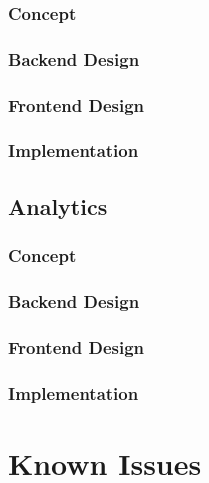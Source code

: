 \subsubsection{Concept}

\subsubsection{Backend Design}

\subsubsection{Frontend Design}

\subsubsection{Implementation}

\subsection{Analytics}

\subsubsection{Concept}

\subsubsection{Backend Design}

\subsubsection{Frontend Design}

\subsubsection{Implementation}

\section{Known Issues}